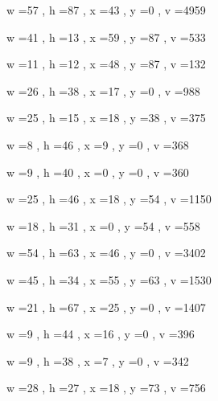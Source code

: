 \documentclass[11pt]{article}
\begin{document}
w =57 , h =87 , x =43 , y =0 , v =4959
\par
w =41 , h =13 , x =59 , y =87 , v =533
\par
w =11 , h =12 , x =48 , y =87 , v =132
\par
w =26 , h =38 , x =17 , y =0 , v =988
\par
w =25 , h =15 , x =18 , y =38 , v =375
\par
w =8 , h =46 , x =9 , y =0 , v =368
\par
w =9 , h =40 , x =0 , y =0 , v =360
\par
w =25 , h =46 , x =18 , y =54 , v =1150
\par
w =18 , h =31 , x =0 , y =54 , v =558
\par
\newpage




w =54 , h =63 , x =46 , y =0 , v =3402
\par
w =45 , h =34 , x =55 , y =63 , v =1530
\par
w =21 , h =67 , x =25 , y =0 , v =1407
\par
w =9 , h =44 , x =16 , y =0 , v =396
\par
w =9 , h =38 , x =7 , y =0 , v =342
\par
w =28 , h =27 , x =18 , y =73 , v =756
\par
\newpage
\end{document}
